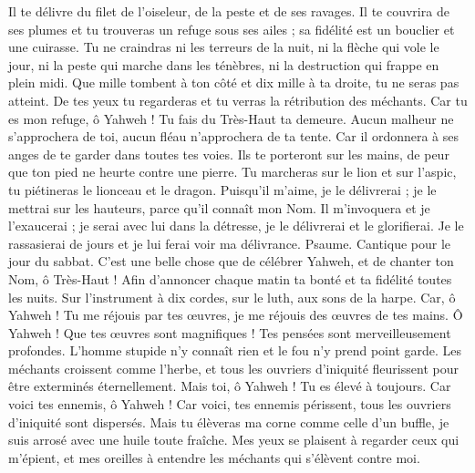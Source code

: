 \begin{multicols}{2}
Il te délivre du filet de l’oiseleur, de la peste et de ses ravages.
Il te couvrira de ses plumes et tu trouveras un refuge sous ses ailes ; sa fidélité est un bouclier et une cuirasse.
Tu ne craindras ni les terreurs de la nuit, ni la flèche qui vole le jour,
ni la peste qui marche dans les ténèbres, ni la destruction qui frappe en plein midi.
Que mille tombent à ton côté et dix mille à ta droite, tu ne seras pas atteint.
De tes yeux tu regarderas et tu verras la rétribution des méchants.
Car tu es mon refuge, ô Yahweh ! Tu fais du Très-Haut ta demeure.
Aucun malheur ne s’approchera de toi, aucun fléau n'approchera de ta tente.
Car il ordonnera à ses anges de te garder dans toutes tes voies.
Ils te porteront sur les mains, de peur que ton pied ne heurte contre une pierre.
Tu marcheras sur le lion et sur l'aspic, tu piétineras le lionceau et le dragon.
Puisqu'il m'aime, je le délivrerai ; je le mettrai sur les hauteurs, parce qu'il connaît mon Nom.
Il m'invoquera et je l'exaucerai ; je serai avec lui dans la détresse, je le délivrerai et le glorifierai.
Je le rassasierai de jours et je lui ferai voir ma délivrance.
\VerseOne{}Psaume. Cantique pour le jour du sabbat.
C'est une belle chose que de célébrer Yahweh, et de chanter ton Nom, ô Très-Haut !
Afin d'annoncer chaque matin ta bonté et ta fidélité toutes les nuits.
Sur l'instrument à dix cordes, sur le luth, aux sons de la harpe.
Car, ô Yahweh ! Tu me réjouis par tes œuvres, je me réjouis des œuvres de tes mains.
Ô Yahweh ! Que tes œuvres sont magnifiques ! Tes pensées sont merveilleusement profondes.
L'homme stupide n'y connaît rien et le fou n’y prend point garde.
Les méchants croissent comme l'herbe, et tous les ouvriers d'iniquité fleurissent pour être exterminés éternellement.
Mais toi, ô Yahweh ! Tu es élevé à toujours.
Car voici tes ennemis, ô Yahweh ! Car voici, tes ennemis périssent, tous les ouvriers d'iniquité sont dispersés.
Mais tu élèveras ma corne comme celle d'un buffle, je suis arrosé avec une huile toute fraîche.
Mes yeux se plaisent à regarder ceux qui m'épient, et mes oreilles à entendre les méchants qui s'élèvent contre moi.

\end{multicols}
